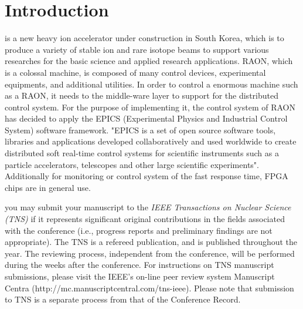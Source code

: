 \documentclass[journal]{IEEEtran}
\begin{document}


\section{Introduction}
% 
% 
% 
% 
 is a new heavy ion accelerator under construction in South Korea, which is to produce a variety of stable ion and rare isotope beams to support various researches for the basic science and applied research applications\cite{risp}. RAON, which is a colossal machine, is composed of many control devices, experimental equipments, and additional utilities. In order to control a enormous machine such as a RAON, it needs to the middle-ware layer to support for the distributed control system. For the purpose of  implementing it, the control system of RAON has decided to apply the EPICS (Experimental Physics and Industrial Control System) software framework. "EPICS is a set of open source software tools, libraries and applications developed collaboratively and used worldwide to create distributed soft real-time control systems for scientific instruments such as a particle accelerators, telescopes and other large scientific experiments"\cite{epics}. Additionally for monitoring or control system of the fast response time, FPGA chips are in general use.



you may submit your manuscript to the \emph{IEEE Transactions on Nuclear Science (TNS)} if it represents significant original contributions in the fields associated with the conference (i.e., progress reports and preliminary findings are not appropriate).  The TNS is a refereed publication, and is published throughout the year. The reviewing process, independent from the conference, will be performed during the weeks after the conference. For instructions on TNS  manuscript submissions, please visit the IEEE's on-line peer review system Manuscript Centra   (http://mc.manuscriptcentral.com/tns-ieee). Please note that submission to TNS  is a separate process from that of the Conference Record.
\end{document}
